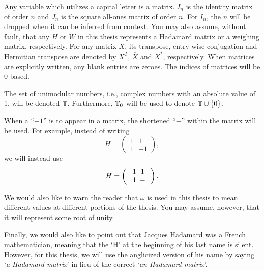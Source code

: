 Any variable which utilizes a capital letter is a matrix. $I_n$ is the identity matrix of order $n$ and $J_n$ is the square all-ones matrix of order $n$. For $I_n$, the $n$ will be dropped when it can be inferred from context. You may also assume, without fault, that any $H$ or $W$ in this thesis represents a Hadamard matrix or a weighing matrix, respectively. For any matrix $X$, its transpose, entry-wise conjugation and Hermitian transpose are denoted by $X^T$, $\overline{X}$ and $X^*$, respectively. When matrices are explicitly written, any blank entries are zeroes. The indices of matrices will be 0-based.

The set of unimodular numbers, i.e., complex numbers with an absolute value of 1, will be denoted $\mathbb{T}$. Furthermore, $\mathbb{T}_0$ will be used to denote $\mathbb{T} \cup \left\{0\right\}$.

When a ``$-1$'' is to appear in a matrix, the shortened ``$-$'' within the matrix will be used. For example, instead of writing
$$H=\left(\begin{array}{rr}1&1 \\ 1&-1\end{array}\right),$$
we will instead use
$$H=\left(\begin{array}{cc}\Zp\Zp \\ \Zp\Zm\end{array}\right).$$

We would also like to warn the reader that $\omega$ is used in this thesis to mean different values at different portions of the thesis. You may assume, however, that it will represent some root of unity.

Finally, we would also like to point out that Jacques Hadamard was a French mathematician, meaning that the `H' at the beginning of his last name is silent. However, for this thesis, we will use the anglicized version of his name by saying `{\it a Hadamard matrix}' in lieu of the correct `{\it an Hadamard matrix}'.
